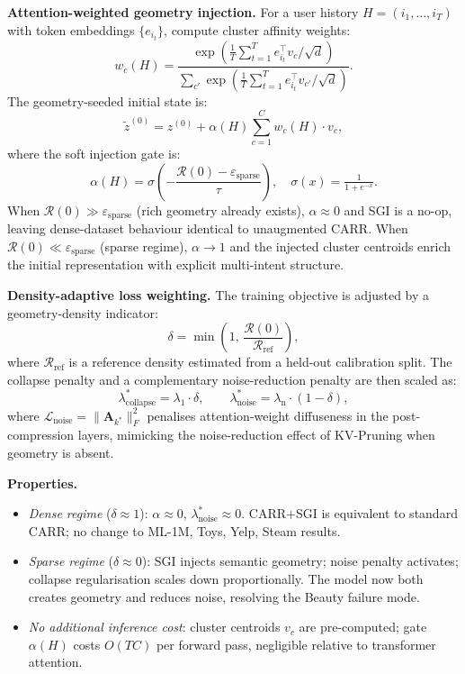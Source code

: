 \documentclass[lettersize,journal]{IEEEtran}
\begin{document}
\textbf{Attention-weighted geometry injection.} For a user history $H = (i_1, \ldots, i_T)$ with token embeddings $\{e_{i_t}\}$, compute cluster affinity weights:
\begin{equation}
w_c(H) = \frac{\exp\!\left(\frac{1}{T}\sum_{t=1}^T e_{i_t}^\top v_c / \sqrt{d}\right)}{\sum_{c'}\exp\!\left(\frac{1}{T}\sum_{t=1}^T e_{i_t}^\top v_{c'} / \sqrt{d}\right)}.
\end{equation}
The geometry-seeded initial state is:
\begin{equation}
\tilde{z}^{(0)} = z^{(0)} + \alpha(H)\sum_{c=1}^C w_c(H)\cdot v_c,
\end{equation}
where the soft injection gate is:
\begin{equation}
\alpha(H) = \sigma\!\left(-\frac{\mathcal{R}(0) - \varepsilon_{\mathrm{sparse}}}{\tau}\right), \quad \sigma(x)=\tfrac{1}{1+e^{-x}}.
\end{equation}
When $\mathcal{R}(0) \gg \varepsilon_{\mathrm{sparse}}$ (rich geometry already exists), $\alpha \approx 0$ and SGI is a no-op, leaving dense-dataset behaviour identical to unaugmented CARR. When $\mathcal{R}(0) \ll \varepsilon_{\mathrm{sparse}}$ (sparse regime), $\alpha \to 1$ and the injected cluster centroids enrich the initial representation with explicit multi-intent structure.

\textbf{Density-adaptive loss weighting.} The training objective is adjusted by a geometry-density indicator:
\begin{equation}
\delta = \min\!\left(1,\, \frac{\mathcal{R}(0)}{\mathcal{R}_{\mathrm{ref}}}\right),
\end{equation}
where $\mathcal{R}_{\mathrm{ref}}$ is a reference density estimated from a held-out calibration split. The collapse penalty and a complementary noise-reduction penalty are then scaled as:
\begin{equation}
\lambda_{\mathrm{collapse}}^* = \lambda_1 \cdot \delta, \qquad \lambda_{\mathrm{noise}}^* = \lambda_{\mathrm{n}} \cdot (1 - \delta),
\end{equation}
where $\mathcal{L}_{\mathrm{noise}} = \|\mathbf{A}_{k^*}\|_F^2$ penalises attention-weight diffuseness in the post-compression layers, mimicking the noise-reduction effect of KV-Pruning when geometry is absent.

\textbf{Properties.}
\begin{itemize}
  \item \emph{Dense regime} ($\delta \approx 1$): $\alpha \approx 0$, $\lambda_{\mathrm{noise}}^* \approx 0$. CARR+SGI is equivalent to standard CARR; no change to ML-1M, Toys, Yelp, Steam results.
  \item \emph{Sparse regime} ($\delta \approx 0$): SGI injects semantic geometry; noise penalty activates; collapse regularisation scales down proportionally. The model now both creates geometry and reduces noise, resolving the Beauty failure mode.
  \item \emph{No additional inference cost}: cluster centroids $v_c$ are pre-computed; gate $\alpha(H)$ costs $O(TC)$ per forward pass, negligible relative to transformer attention.
\end{itemize}
\end{document}
